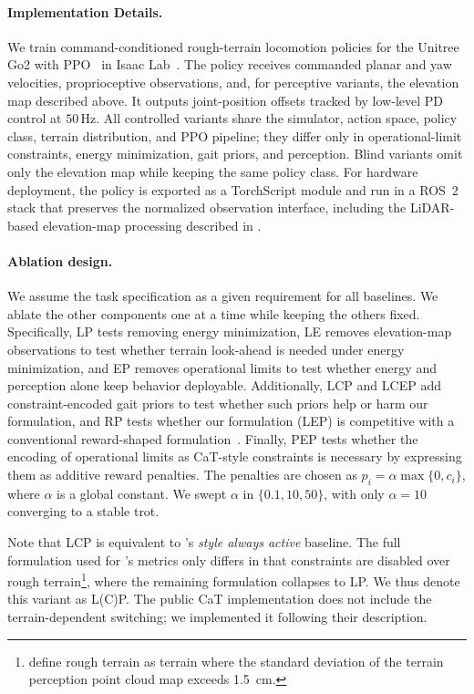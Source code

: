 \documentclass{article}
\newcommand{\baselineOne}{LCP}
\newcommand{\baselineTwo}{LP}
\newcommand{\baselineThree}{LCEP}
\newcommand{\baselineFour}{LEP}
\newcommand{\baselineFive}{RP}
\newcommand{\baselineSix}{EP}
\newcommand{\baselineFourBlind}{LE}
\begin{document}
    \paragraph{Implementation Details.}
    We train command-conditioned rough-terrain locomotion policies for the Unitree Go2 with PPO~\citep{schulmanProximalPolicyOptimization2017} in Isaac Lab~\citep{mittal2025isaaclab}. 
    The policy receives commanded planar and yaw velocities, proprioceptive observations, and, for perceptive variants, the elevation map described above. 
    It outputs joint-position offsets tracked by low-level PD control at \(50\,\mathrm{Hz}\). 
    All controlled variants share the simulator, action space, policy class, terrain distribution, and PPO pipeline; they differ only in operational-limit constraints, energy minimization, gait priors, and perception. 
    Blind variants omit only the elevation map while keeping the same policy class. 
    For hardware deployment, the policy is exported as a TorchScript module and run in a ROS~2 stack that preserves the normalized observation interface, including the LiDAR-based elevation-map processing described in .

    \paragraph{Ablation design.}
    We assume the task specification as a given requirement for all baselines. We ablate the other components one at a time while keeping the others fixed. Specifically, \baselineTwo{} tests removing energy minimization, \baselineFourBlind{} removes elevation-map observations to test whether terrain look-ahead is needed under energy minimization, and \baselineSix{} removes operational limits to test whether energy and perception alone keep behavior deployable. Additionally, \baselineOne{} and \baselineThree{} add constraint-encoded gait priors to test whether such priors help or harm our formulation, and \baselineFive{} tests whether our formulation (\baselineFour{}) is competitive with a conventional reward-shaped formulation~\citep{rudinLearningWalkMinutes2022a}. Finally, PEP tests whether the encoding of operational limits as CaT-style constraints is necessary by expressing them as additive reward penalties. The penalties are chosen as $p_i = \alpha \max\{0, c_i\}$, where $\alpha$ is a global constant. We swept $\alpha$ in $\{0.1, 10, 50\}$, with only $\alpha=10$ converging to a stable trot.

     Note that \baselineOne{} is equivalent to \citet{chane-saneCaTConstraintsTerminations2024a}'s \emph{style always active} baseline. The full formulation used for \citet{chane-saneCaTConstraintsTerminations2024a}'s metrics only differs in that constraints are disabled over rough terrain\footnote{\citeauthor{chane-saneCaTConstraintsTerminations2024a} define rough terrain as terrain where the standard deviation of the terrain perception point cloud map exceeds \SI{1.5}{\centi\meter}.\label{fn:rough-terrain}}, where the remaining formulation collapses to \baselineTwo{}. We thus denote this variant as L(C)P. The public CaT implementation does not include the terrain-dependent switching; we implemented it following their description.
\end{document}
